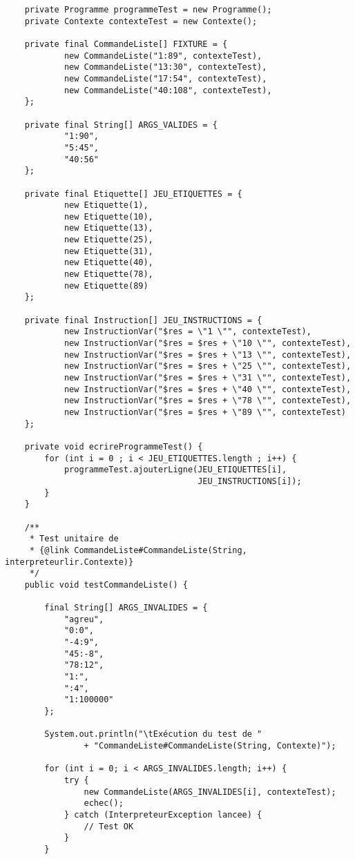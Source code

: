 \begin{enum}
\begin{verbatim}
    private Programme programmeTest = new Programme();
    private Contexte contexteTest = new Contexte();

    private final CommandeListe[] FIXTURE = {
            new CommandeListe("1:89", contexteTest),
            new CommandeListe("13:30", contexteTest),
            new CommandeListe("17:54", contexteTest),
            new CommandeListe("40:108", contexteTest),
    };
    
    private final String[] ARGS_VALIDES = {
            "1:90",
            "5:45",
            "40:56"
    };
    
    private final Etiquette[] JEU_ETIQUETTES = {
            new Etiquette(1),
            new Etiquette(10),
            new Etiquette(13),
            new Etiquette(25),
            new Etiquette(31),
            new Etiquette(40),
            new Etiquette(78),
            new Etiquette(89)
    };
    
    private final Instruction[] JEU_INSTRUCTIONS = {
            new InstructionVar("$res = \"1 \"", contexteTest),
            new InstructionVar("$res = $res + \"10 \"", contexteTest),
            new InstructionVar("$res = $res + \"13 \"", contexteTest),
            new InstructionVar("$res = $res + \"25 \"", contexteTest),
            new InstructionVar("$res = $res + \"31 \"", contexteTest),
            new InstructionVar("$res = $res + \"40 \"", contexteTest),
            new InstructionVar("$res = $res + \"78 \"", contexteTest),
            new InstructionVar("$res = $res + \"89 \"", contexteTest)
    };
    
    private void ecrireProgrammeTest() {
        for (int i = 0 ; i < JEU_ETIQUETTES.length ; i++) {
            programmeTest.ajouterLigne(JEU_ETIQUETTES[i], 
                                       JEU_INSTRUCTIONS[i]);
        }
    }
    
    /** 
     * Test unitaire de 
     * {@link CommandeListe#CommandeListe(String, interpreteurlir.Contexte)}
     */
    public void testCommandeListe() {
        
        final String[] ARGS_INVALIDES = {
            "agreu",
            "0:0",
            "-4:9",
            "45:-8",
            "78:12",
            "1:",
            ":4",
            "1:100000"
        };
        
        System.out.println("\tExécution du test de "
                + "CommandeListe#CommandeListe(String, Contexte)");
        
        for (int i = 0; i < ARGS_INVALIDES.length; i++) {
            try {
                new CommandeListe(ARGS_INVALIDES[i], contexteTest);
                echec();
            } catch (InterpreteurException lancee) {
                // Test OK
            }
        }
        

\end{verbatim}
\end{enum}
